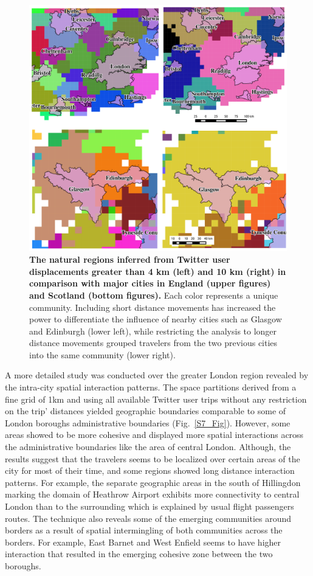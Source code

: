\documentclass[10pt,letterpaper]{article}
\begin{document}
\begin{figure}[ht]
\includegraphics[width=0.7\linewidth]{./figure/PNG/S6_community_london}
\caption{{\bf The natural regions inferred from Twitter user displacements greater than 4 km (left) and 10 km (right) in comparison with major cities in England (upper figures) and Scotland (bottom figures).}  Each color represents a unique community. Including short distance movements has increased the power to differentiate the influence of nearby cities such as Glasgow and Edinburgh (lower left), while restricting the analysis to longer distance movements grouped travelers from the two previous cities into the same community (lower right).}
\label{S6_Fig}
\end{figure}

A more detailed study was conducted over the greater London region revealed by the intra-city spatial interaction patterns.
The space partitions derived from a fine grid of 1km and using all available Twitter user trips without any restriction on the trip’ distances yielded geographic boundaries comparable to some of London boroughs administrative boundaries (Fig.~\ref{S7_Fig}).
However, some areas showed to be more cohesive and displayed more spatial interactions across the administrative boundaries like the area of central London.
Although, the results suggest that the travelers seems to be localized over certain areas of the city for most of their time, and some regions showed long distance interaction patterns.
For example, the separate geographic areas in the south of Hillingdon marking the domain of Heathrow Airport exhibits more connectivity to central London than to the surrounding which is explained by usual flight passengers routes.
The technique also reveals some of the emerging communities around  borders as a result of spatial intermingling of both communities across the borders.
For example, East Barnet and West Enfield seems to have higher interaction that resulted in the emerging cohesive zone between the two boroughs.
\end{document}

